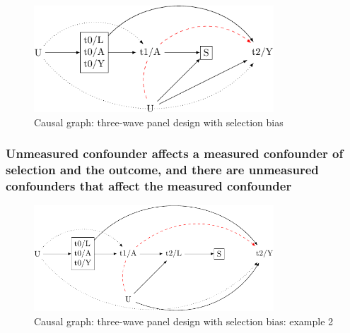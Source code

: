 \documentclass[
  singlecolumn]{report}
\begin{document}
\begin{figure}

{\centering \includegraphics[width=0.8\textwidth,height=\textheight]{causal-dags_files/figure-pdf/fig-dag-8-1.pdf}

}

\caption{\label{fig-dag-8}Causal graph: three-wave panel design with
selection bias}

\end{figure}

\hypertarget{unmeasured-confounder-affects-a-measured-confounder-of-selection-and-the-outcome-and-there-are-unmeasured-confounders-that-affect-the-measured-confounder}{%
\subsubsection{Unmeasured confounder affects a measured confounder of
selection and the outcome, and there are unmeasured confounders that
affect the measured
confounder}\label{unmeasured-confounder-affects-a-measured-confounder-of-selection-and-the-outcome-and-there-are-unmeasured-confounders-that-affect-the-measured-confounder}}

\begin{figure}

{\centering \includegraphics[width=0.8\textwidth,height=\textheight]{causal-dags_files/figure-pdf/fig-dag-8-2-1.pdf}

}

\caption{\label{fig-dag-8-2}Causal graph: three-wave panel design with
selection bias: example 2}

\end{figure}
\end{document}
